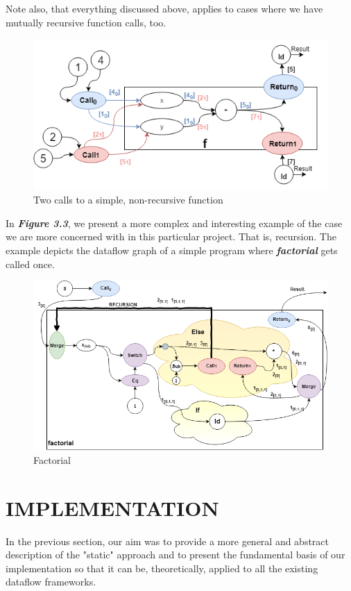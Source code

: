 \documentclass[ack,preface]{dithesis}
\begin{document}
Note also, that everything discussed above, applies to cases where we have mutually recursive function calls, too. 

\begin{figure}
\centering
\includegraphics[scale=0.7]{figures/Example2}
\caption{Two calls to a simple, non-recursive function}
\end{figure}

In  \textit{\textbf{Figure 3.3}}, we present a more complex and interesting example of the case we are more concerned with in this particular project. That is, recursion. The example depicts the dataflow graph of a simple program where  \textit{\textbf{factorial}} gets called once.

\begin{figure}
\centering
\includegraphics[scale=0.65]{figures/factorial}
\caption{Factorial}
\end{figure}

\chapter{IMPLEMENTATION}
In the previous section, our aim was to provide a more general and abstract description of the "static" approach and to present the fundamental basis of our implementation so that it can be, theoretically, applied to all the existing dataflow frameworks. 
\end{document}
